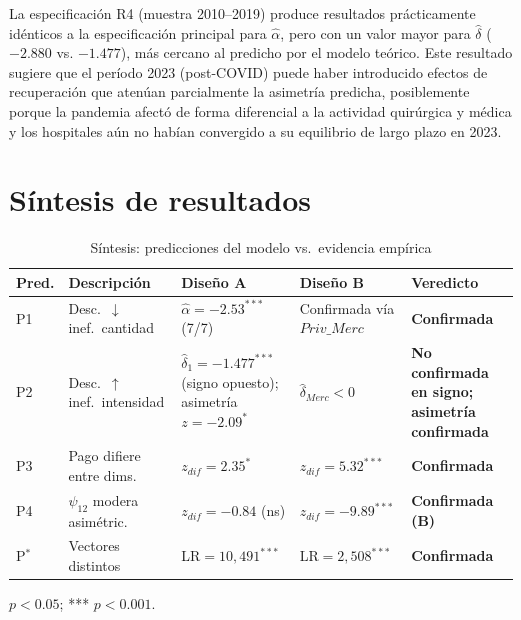 \documentclass[12pt, a4paper, twoside, openright]{book}
\theoremstyle{plain}
\theoremstyle{definition}
\theoremstyle{remark}
\begin{document}
La especificación R4 (muestra 2010--2019) produce resultados prácticamente idénticos a la especificación principal para $\hat{\alpha}$, pero con un valor mayor para $\hat{\delta}$ ($-2.880$ vs. $-1.477$), más cercano al predicho por el modelo teórico. Este resultado sugiere que el período 2023 (post-COVID) puede haber introducido efectos de recuperación que atenúan parcialmente la asimetría predicha, posiblemente porque la pandemia afectó de forma diferencial a la actividad quirúrgica y médica y los hospitales aún no habían convergido a su equilibrio de largo plazo en 2023.

\section{Síntesis de resultados}

\begin{table}[htbp]
\centering
\caption{Síntesis: predicciones del modelo vs.\ evidencia empírica}
\label{tab:sintesis}
\begin{threeparttable}
\small
\begin{tabular}{p{0.8cm}p{3.5cm}p{3cm}p{3cm}p{1.5cm}}
\toprule
\textbf{Pred.} & \textbf{Descripción} &
\textbf{Diseño A} & \textbf{Diseño B} &
\textbf{Veredicto} \\
\midrule
P1 & Desc.\ $\downarrow$ inef.\ cantidad
  & $\hat{\alpha}=-2.53^{***}$ (7/7)
  & Confirmada vía $Priv\_Merc$
  & \textbf{Confirmada} \\[6pt]
P2 & Desc.\ $\uparrow$ inef.\ intensidad
  & $\hat{\delta}_1 = -1.477^{***}$ (signo opuesto); asimetría $z = -2.09^{*}$
  & $\hat{\delta}_{Merc}<0$
  & \textbf{No confirmada en signo; asimetría confirmada} \\[6pt]
P3 & Pago difiere entre dims.
  & $z_{dif}=2.35^{*}$
  & $z_{dif}=5.32^{***}$
  & \textbf{Confirmada} \\[6pt]
P4 & $\psi_{12}$ modera asimétric.
  & $z_{dif}=-0.84$ (ns)
  & $z_{dif}=-9.89^{***}$
  & \textbf{Confirmada (B)} \\[6pt]
P$^*$ & Vectores distintos
  & LR$=10{,}491^{***}$
  & LR$=2{,}508^{***}$
  & \textbf{Confirmada} \\
\bottomrule
\end{tabular}
\begin{tablenotes}
  \small
  \item * $p<0.05$; *** $p<0.001$.
\end{tablenotes}
\end{threeparttable}
\end{table}
\end{document}
